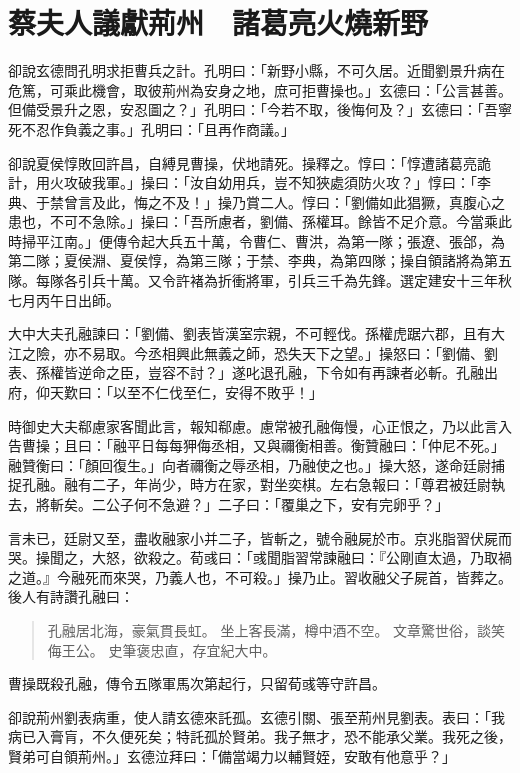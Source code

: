 
\chapter{蔡夫人議獻荊州　諸葛亮火燒新野}

卻說玄德問孔明求拒曹兵之計。孔明曰：「新野小縣，不可久居。近聞劉景升病在危篤，可乘此機會，取彼荊州為安身之地，庶可拒曹操也。」玄德曰：「公言甚善。但備受景升之恩，安忍圖之？」孔明曰：「今若不取，後悔何及？」玄德曰：「吾寧死不忍作負義之事。」孔明曰：「且再作商議。」

卻說夏侯惇敗回許昌，自縛見曹操，伏地請死。操釋之。惇曰：「惇遭諸葛亮詭計，用火攻破我軍。」操曰：「汝自幼用兵，豈不知狹處須防火攻？」惇曰：「李典、于禁曾言及此，悔之不及！」操乃賞二人。惇曰：「劉備如此猖獗，真腹心之患也，不可不急除。」操曰：「吾所慮者，劉備、孫權耳。餘皆不足介意。今當乘此時掃平江南。」便傳令起大兵五十萬，令曹仁、曹洪，為第一隊；張遼、張郃，為第二隊；夏侯淵、夏侯惇，為第三隊；于禁、李典，為第四隊；操自領諸將為第五隊。每隊各引兵十萬。又令許褚為折衝將軍，引兵三千為先鋒。選定建安十三年秋七月丙午日出師。

大中大夫孔融諫曰：「劉備、劉表皆漢室宗親，不可輕伐。孫權虎踞六郡，且有大江之險，亦不易取。今丞相興此無義之師，恐失天下之望。」操怒曰：「劉備、劉表、孫權皆逆命之臣，豈容不討？」遂叱退孔融，下令如有再諫者必斬。孔融出府，仰天歎曰：「以至不仁伐至仁，安得不敗乎！」

時御史大夫郗慮家客聞此言，報知郗慮。慮常被孔融侮慢，心正恨之，乃以此言入告曹操；且曰：「融平日每每狎侮丞相，又與禰衡相善。衡贊融曰：「仲尼不死。」融贊衡曰：「顏回復生。」向者禰衡之辱丞相，乃融使之也。」操大怒，遂命廷尉捕捉孔融。融有二子，年尚少，時方在家，對坐奕棋。左右急報曰：「尊君被廷尉執去，將斬矣。二公子何不急避？」二子曰：「覆巢之下，安有完卵乎？」

言未已，廷尉又至，盡收融家小并二子，皆斬之，號令融屍於市。京兆脂習伏屍而哭。操聞之，大怒，欲殺之。荀彧曰：「彧聞脂習常諫融曰：『公剛直太過，乃取禍之道。』今融死而來哭，乃義人也，不可殺。」操乃止。習收融父子屍首，皆葬之。後人有詩讚孔融曰：

\begin{quote}
孔融居北海，豪氣貫長虹。
坐上客長滿，樽中酒不空。
文章驚世俗，談笑侮王公。
史筆褒忠直，存宜紀大中。
\end{quote}

曹操既殺孔融，傳令五隊軍馬次第起行，只留荀彧等守許昌。

卻說荊州劉表病重，使人請玄德來託孤。玄德引關、張至荊州見劉表。表曰：「我病已入膏肓，不久便死矣；特託孤於賢弟。我子無才，恐不能承父業。我死之後，賢弟可自領荊州。」玄德泣拜曰：「備當竭力以輔賢姪，安敢有他意乎？」

